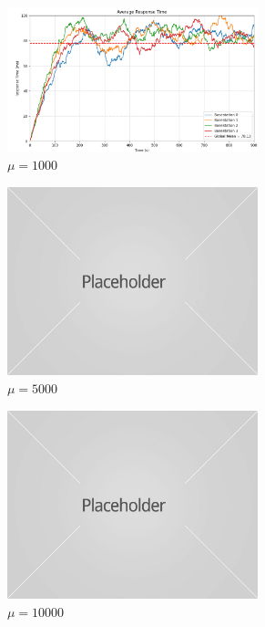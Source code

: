 \documentclass{report}
\begin{document}
\begin{figure}[H]
    \begin{subfigure}{0.55\textwidth}
        \centering
        \includegraphics[width=0.8\textwidth]{img/rt_sr_1k.png}
        \caption{$\mu = 1000$}
    \end{subfigure}
    \begin{subfigure}{0.55\textwidth}
        \centering
        \includegraphics[width=0.8\textwidth]{img/placeholder.jpg}
        \caption{$\mu = 5000$}
    \end{subfigure}
    \begin{subfigure}{0.55\textwidth}
        \centering
        \includegraphics[width=0.8\textwidth]{img/placeholder.jpg}
        \caption{$\mu = 10000$}
    \end{subfigure}
    \caption{}
\end{figure}
\end{document}
